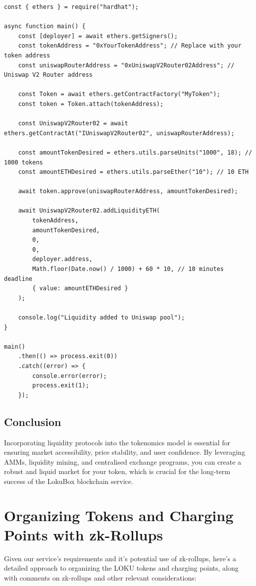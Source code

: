 \documentclass{tufte-handout}
\begin{document}
\begin{verbatim}
const { ethers } = require("hardhat");

async function main() {
    const [deployer] = await ethers.getSigners();
    const tokenAddress = "0xYourTokenAddress"; // Replace with your token address
    const uniswapRouterAddress = "0xUniswapV2Router02Address"; // Uniswap V2 Router address

    const Token = await ethers.getContractFactory("MyToken");
    const token = Token.attach(tokenAddress);

    const UniswapV2Router02 = await ethers.getContractAt("IUniswapV2Router02", uniswapRouterAddress);

    const amountTokenDesired = ethers.utils.parseUnits("1000", 18); // 1000 tokens
    const amountETHDesired = ethers.utils.parseEther("10"); // 10 ETH

    await token.approve(uniswapRouterAddress, amountTokenDesired);

    await UniswapV2Router02.addLiquidityETH(
        tokenAddress,
        amountTokenDesired,
        0,
        0,
        deployer.address,
        Math.floor(Date.now() / 1000) + 60 * 10, // 10 minutes deadline
        { value: amountETHDesired }
    );

    console.log("Liquidity added to Uniswap pool");
}

main()
    .then(() => process.exit(0))
    .catch((error) => {
        console.error(error);
        process.exit(1);
    });
\end{verbatim}

\subsection*{Conclusion}

Incorporating liquidity protocols into the tokenomics model is essential for ensuring market accessibility, price stability, and user confidence.
By leveraging AMMs, liquidity mining, and centralised exchange programs, you can create a robust and liquid market for your token, which is crucial for the
long-term success of the LokuBox blockchain service.

\section*{Organizing Tokens and Charging Points with zk-Rollups}

Given our service's requirements and it's potential use of zk-rollups, here's a detailed approach to organizing the LOKU tokens and charging points, along with
comments on zk-rollups and other relevant considerations:
\end{document}
